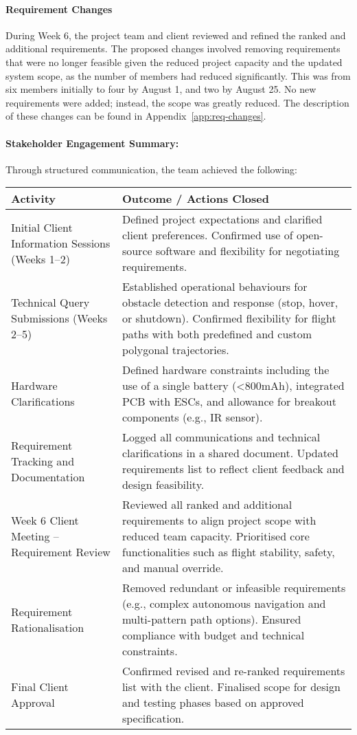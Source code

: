 \paragraph{\textbf{Requirement Changes}} \leavevmode

During Week 6, the project team and client reviewed and refined the ranked and additional requirements.  The proposed changes involved removing requirements that were no longer feasible given the reduced project capacity and the updated system scope, as the number of members had reduced significantly. This was from six members initially to four by August 1, and two by August 25. No new requirements were added; instead, the scope was greatly reduced. The description of these changes can be found in Appendix~\ref{app:req-changes}.

\pagebreak
\paragraph{\textbf{Stakeholder Engagement Summary:}} \leavevmode

Through structured communication, the team achieved the following: \

\begin{tabular}{|p{4cm}|p{11.5cm}|}
\hline
\rowcolor{gray!15}
\textbf{Activity} & \textbf{Outcome / Actions Closed} \\
\hline
Initial Client Information Sessions (Weeks 1–2) & Defined project expectations and clarified client preferences. Confirmed use of open-source software and flexibility for negotiating requirements. \\ \hline
Technical Query Submissions (Weeks 2–5) & Established operational behaviours for obstacle detection and response (stop, hover, or shutdown). Confirmed flexibility for flight paths with both predefined and custom polygonal trajectories. \\ \hline
Hardware Clarifications & Defined hardware constraints including the use of a single battery (<800mAh), integrated PCB with ESCs, and allowance for breakout components (e.g., IR sensor). \\ \hline
Requirement Tracking and Documentation & Logged all communications and technical clarifications in a shared document. Updated requirements list to reflect client feedback and design feasibility. \\ \hline
Week 6 Client Meeting – Requirement Review & Reviewed all ranked and additional requirements to align project scope with reduced team capacity. Prioritised core functionalities such as flight stability, safety, and manual override. \\ \hline
Requirement Rationalisation & Removed redundant or infeasible requirements (e.g., complex autonomous navigation and multi-pattern path options). Ensured compliance with budget and technical constraints. \\ \hline
Final Client Approval & Confirmed revised and re-ranked requirements list with the client. Finalised scope for design and testing phases based on approved specification. \\ \hline
\end{tabular}